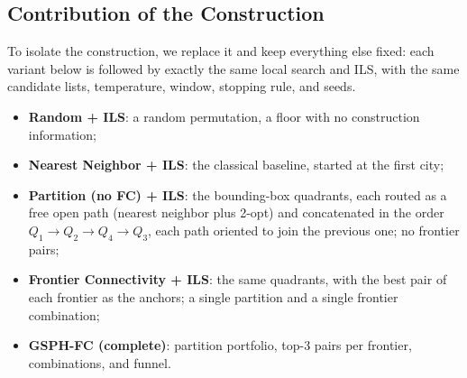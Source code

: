 \documentclass[runningheads]{llncs}
\begin{document}
\subsection{Contribution of the Construction}
\label{sec:ablation}

To isolate the construction, we replace it and keep everything else
fixed: each variant below is followed by exactly the same local search
and ILS, with the same candidate lists, temperature, window, stopping
rule, and seeds.
\begin{itemize}
  \item \textbf{Random + ILS}: a random permutation, a floor with no
    construction information;
  \item \textbf{Nearest Neighbor + ILS}: the classical baseline, started
    at the first city;
  \item \textbf{Partition (no FC) + ILS}: the bounding-box quadrants,
    each routed as a free open path (nearest neighbor plus 2-opt) and
    concatenated in the order $Q_1\!\to\!Q_2\!\to\!Q_4\!\to\!Q_3$, each
    path oriented to join the previous one; no frontier pairs;
  \item \textbf{Frontier Connectivity + ILS}: the same quadrants, with
    the best pair of each frontier as the anchors; a single partition and
    a single frontier combination;
  \item \textbf{GSPH-FC (complete)}: partition portfolio, top-3 pairs per
    frontier, combinations, and funnel.
\end{itemize}
\end{document}
